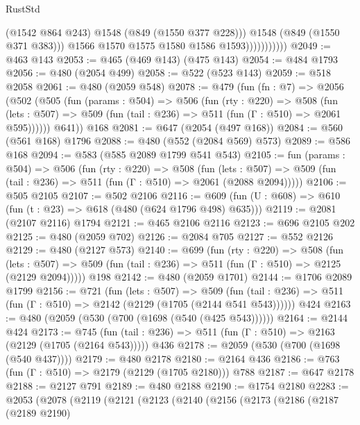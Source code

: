 \begin{lexlean}{RustStd}
\begin{coremodule}
{\begin{coremodule}
{{{{{{{{{                              (@1542 @864 @243)
                              @1548
                              (@849 (@1550 @377 @228)))
                            @1548
                            (@849 (@1550 @371 @383)))
                          @1566
                          @1570
                          @1575
                          @1580
                          @1586
                          @1593)))))))))))
@2049 := @463 @143
@2053 := @465 (@469 @143) (@475 @143)
@2054 := @484 @1793
@2056 := @480 (@2054 @499)
@2058 := @522 (@523 @143)
@2059 := @518 @2058
@2061 := @480 (@2059 @548)
@2078 := @479
    (fun (fn : @7) =>
    @2056
      (@502
        (@505
          (fun (params : @504) =>
          @506
            (fun (rty : @220) =>
            @508
              (fun (lets : @507) =>
              @509 (fun (tail : @236) => @511 (fun (Γ : @510) => @2061 @595))))))
        @641))
    @168
@2081 := @647 (@2054 (@497 @168))
@2084 := @560 (@561 @168) @1796
@2088 := @480 (@552 (@2084 @569) @573)
@2089 := @586 @168
@2094 := @583 (@585 @2089 @1799 @541 @543)
@2105 := fun (params : @504) =>
  @506
    (fun (rty : @220) =>
    @508
      (fun (lets : @507) =>
      @509 (fun (tail : @236) => @511 (fun (Γ : @510) => @2061 (@2088 @2094)))))
@2106 := @505 @2105
@2107 := @502 @2106
@2116 := @609 (fun (U : @608) => @610 (fun (t : @23) => @618 (@480 (@624 @1796 @498) @635)))
@2119 := @2081 (@2107 @2116) @1794
@2121 := @465 @2106 @2116
@2123 := @696 @2105 @202
@2125 := @480 (@2059 @702)
@2126 := @2084 @705
@2127 := @552 @2126
@2129 := @480 (@2127 @573)
@2140 := @699
    (fun (rty : @220) =>
    @508
      (fun (lets : @507) =>
      @509 (fun (tail : @236) => @511 (fun (Γ : @510) => @2125 (@2129 @2094)))))
    @198
@2142 := @480 (@2059 @1701)
@2144 := @1706 @2089 @1799
@2156 := @721
    (fun (lets : @507) =>
    @509 (fun (tail : @236) => @511 (fun (Γ : @510) => @2142 (@2129 (@1705 (@2144 @541 @543))))))
    @424
@2163 := @480 (@2059 (@530 (@700 (@1698 (@540 (@425 @543))))))
@2164 := @2144 @424
@2173 := @745
    (fun (tail : @236) => @511 (fun (Γ : @510) => @2163 (@2129 (@1705 (@2164 @543)))))
    @436
@2178 := @2059 (@530 (@700 (@1698 (@540 @437))))
@2179 := @480 @2178
@2180 := @2164 @436
@2186 := @763 (fun (Γ : @510) => @2179 (@2129 (@1705 @2180))) @788
@2187 := @647 @2178
@2188 := @2127 @791
@2189 := @480 @2188
@2190 := @1754 @2180
@2283 := @2053
    (@2078
      (@2119
        (@2121
          (@2123
            (@2140
              (@2156
                (@2173
                  (@2186
                    (@2187
                      (@2189 @2190)
}}}}}}}}}
\end{coremodule}}
\end{coremodule}
\end{lexlean}
